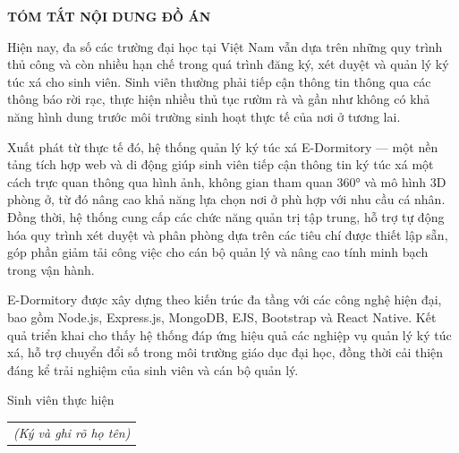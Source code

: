 \documentclass[../DoAn.tex]{subfiles}
\begin{document}
\begin{center}
    {\bfseries\fontsize{18pt}{22pt}\selectfont TÓM TẮT NỘI DUNG ĐỒ ÁN}
\end{center}
\vspace{1.5cm}

Hiện nay, đa số các trường đại học tại Việt Nam vẫn dựa trên những quy trình thủ công và còn nhiều hạn chế trong quá trình đăng ký, xét duyệt và quản lý ký túc xá cho sinh viên. Sinh viên thường phải tiếp cận thông tin thông qua các thông báo rời rạc, thực hiện nhiều thủ tục rườm rà và gần như không có khả năng hình dung trước môi trường sinh hoạt thực tế của nơi ở tương lai.

Xuất phát từ thực tế đó, hệ thống quản lý ký túc xá E-Dormitory --- một nền tảng tích hợp web và di động giúp sinh viên tiếp cận thông tin ký túc xá một cách trực quan thông qua hình ảnh, không gian tham quan 360° và mô hình 3D phòng ở, từ đó nâng cao khả năng lựa chọn nơi ở phù hợp với nhu cầu cá nhân. Đồng thời, hệ thống cung cấp các chức năng quản trị tập trung, hỗ trợ tự động hóa quy trình xét duyệt và phân phòng dựa trên các tiêu chí được thiết lập sẵn, góp phần giảm tải công việc cho cán bộ quản lý và nâng cao tính minh bạch trong vận hành.

E-Dormitory được xây dựng theo kiến trúc đa tầng với các công nghệ hiện đại, bao gồm Node.js, Express.js, MongoDB, EJS, Bootstrap và React Native. Kết quả triển khai cho thấy hệ thống đáp ứng hiệu quả các nghiệp vụ quản lý ký túc xá, hỗ trợ chuyển đổi số trong môi trường giáo dục đại học, đồng thời cải thiện đáng kể trải nghiệm của sinh viên và cán bộ quản lý.

\begin{flushright}
Sinh viên thực hiện\\
\begin{tabular}{@{}c@{}}
\textit{(Ký và ghi rõ họ tên)}
\end{tabular}
\end{flushright}
\end{document}
